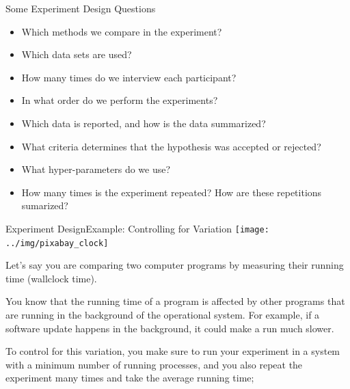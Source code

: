 \begin{frame}{Some Experiment Design Questions}
  \begin{itemize}
    \item Which methods we compare in the experiment?
    \item Which data sets are used?
    \item How many times do we interview each participant?
    \item In what order do we perform the experiments?
    \item Which data is reported, and how is the data summarized?
    \item What criteria determines that the hypothesis was accepted or rejected?
    \item What hyper-parameters do we use?
    \item How many times is the experiment repeated? How are these repetitions sumarized?
  \end{itemize}
\end{frame}


\begin{frame}{Experiment Design}{Example: Controlling for Variation}
  \hfill\texttt{[image: ../img/pixabay\_clock]}

  Let's say you are comparing two computer programs by measuring their running time (wallclock time).
  \bigskip

  You know that the running time of a program is affected by other programs that are running in the background of the operational system. For example, if a software update happens in the background, it could make a run much slower.
  \bigskip

  To control for this variation, you make sure to run your experiment in a system with a minimum number of running processes, and you also repeat the experiment many times and take the average running time;
\end{frame}

